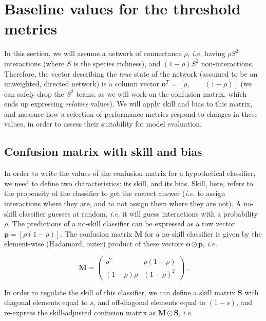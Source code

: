 \documentclass[10pt,oneside]{article}
\begin{document}
\hypertarget{baseline-values-for-the-threshold-metrics}{%
\section{Baseline values for the threshold
metrics}\label{baseline-values-for-the-threshold-metrics}}

In this section, we will assume a network of connectance \(\rho\),
\emph{i.e.} having \(\rho S^2\) interactions (where \(S\) is the species
richness), and \((1-\rho) S^2\) non-interactions. Therefore, the vector
describing the \emph{true} state of the network (assumed to be an
unweighted, directed network) is a column vector
\(\mathbf{o}^T = [\rho, \qquad (1-\rho)]\) (we can safely drop the
\(S^2\) terms, as we will work on the confusion matrix, which ends up
expressing \emph{relative} values). We will apply skill and bias to this
matrix, and measure how a selection of performance metrics respond to
changes in these values, in order to assess their suitability for model
evaluation.

\hypertarget{confusion-matrix-with-skill-and-bias}{%
\subsection{Confusion matrix with skill and
bias}\label{confusion-matrix-with-skill-and-bias}}

In order to write the values of the confusion matrix for a hypothetical
classifier, we need to define two characteristics: its skill, and its
bias. Skill, here, refers to the propensity of the classifier to get the
correct answer (\emph{i.e.} to assign interactions where they are, and
to not assign them where they are not). A no-skill classifier guesses at
random, \emph{i.e.} it will guess interactions with a probability
\(\rho\). The predictions of a no-skill classifier can be expressed as a
row vector \(\mathbf{p} = [\rho (1-\rho)]\). The confusion matrix
\(\mathbf{M}\) for a no-skill classifier is given by the element-wise
(Hadamard, outer) product of these vectors
\(\mathbf{o} \odot \mathbf{p}\), \emph{i.e.}

\[
\mathbf{M} = \begin{pmatrix}
    \rho^2 & \rho (1-\rho) \\
    (1-\rho) \rho & (1-\rho)^2
\end{pmatrix} \,.
\]

In order to regulate the skill of this classifier, we can define a skill
matrix \(\mathbf{S}\) with diagonal elements equal to \(s\), and
off-diagonal elements equal to \((1-s)\), and re-express the
skill-adjusted confusion matrix as \(\mathbf{M} \odot \mathbf{S}\),
\emph{i.e.}
\end{document}
